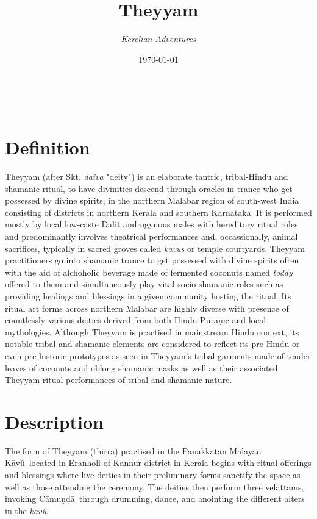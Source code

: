 \documentclass[a4paper, 11pt]{article} %
\title{\textbf{Theyyam}} %
\author{\textit{Kerelian Adventures}} %
\date{\today} %
\makeatletter
\newcommand{\camunda}[0]{C\={a}mu\d{n}\d{d}\={a}}
\newcommand{\kavu}[0]{\textit{k\={a}v\^{u}}}
\newcommand{\Kavu}[0]{K\={a}v\^{u}}
\renewcommand{\maketitle}{ %
\begin{flushright} %
{\LARGE\@title} %

\vspace{10pt} %

{\@author} %
\\\@date %

\vspace{30pt} %
\end{flushright}
}
\makeatother
\begin{document}
\maketitle %

\thispagestyle{empty}


\section{Definition}
  \label{sec:Definition}

Theyyam (after Skt. \textit{daiva} "deity") is an elaborate tantric, tribal-Hindu and shamanic ritual, to have divinities descend through oracles in trance who get possessed by divine spirits, in the northern Malabar region of south-west India consisting of districts in northern Kerala and southern Karnataka. It is performed mostly by local low-caste Dalit androgynous males with hereditory ritual roles and predominantly involves theatrical performances and, occassionally, animal sacrifices, typically in sacred groves called \textit{kavus} or temple courtyards. Theyyam practitioners go into shamanic trance to get possessed with divine spirits often with the aid of alchoholic beverage made of fermented coconuts named \textit{toddy} offered to them and simultaneously play vital socio-shamanic roles such as providing healings and blessings in a given community hosting the ritual. Its ritual art forms across northern Malabar are highly diverse with presence of countlessly various deities derived from both Hindu Purāṇic and local mythologies. Although Theyyam is practised in mainstream Hindu context, its notable tribal and shamanic elements are considered to reflect its pre-Hindu or even pre-historic prototypes as seen in Theyyam's tribal garments made of tender leaves of coconuts and oblong shamanic masks as well as their associated Theyyam ritual performances of tribal and shamanic nature.  

\section{Description}%
  \label{sec:Description}
  
The form of Theyyam (thirra) practised in the Panakkatan Malayan \Kavu\ located in Eranholi of Kannur district in Kerala begins with ritual offerings and blessings where live deities in their preliminary forms sanctify the space as well as those attending the ceremony.
The deities then perform three velattams, invoking \camunda\ through drumming, dance, and anointing the different alters in the \kavu.
\end{document}
